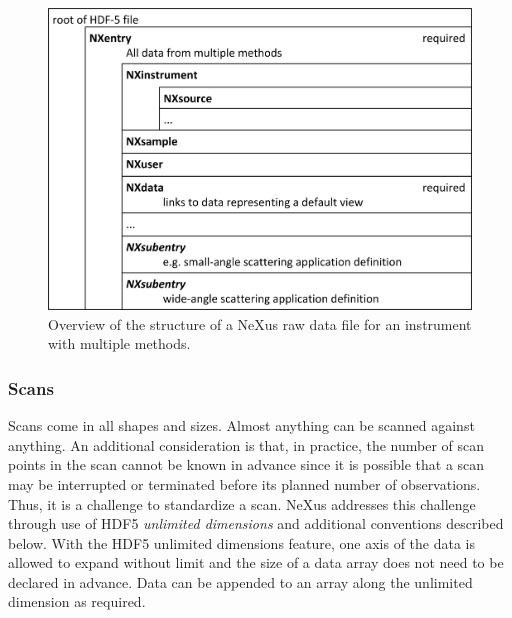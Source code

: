 \documentclass[%
 aip,
rsi,
 amsmath,amssymb,
 reprint,%
]{revtex4-1}
\begin{document}
\begin{figure}
\includegraphics[width=\columnwidth]{figure2}
\caption{\label{multimethod}Overview of the structure of a NeXus raw data file for an instrument with multiple methods.}
\end{figure}

\subsubsection{Scans}

Scans come in all shapes and sizes. Almost anything can be scanned against anything. 
An additional consideration is that, in practice, the number of scan points in the scan 
cannot be known in advance since it is possible that a scan may be interrupted or terminated
before its planned number of observations. 
Thus, it is a challenge to standardize a scan.
NeXus addresses this challenge through use of HDF5 \emph{unlimited dimensions} and
additional conventions described below.
With the HDF5 
unlimited dimensions feature, one axis of the data is allowed to expand without limit and 
the size of a data array does not need to be declared in advance. Data can be appended 
to an array along the unlimited dimension as required. 
\end{document}
